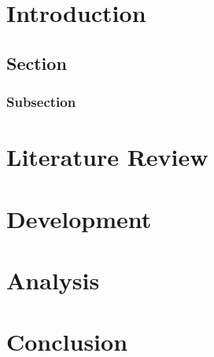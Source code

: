 
\chapter{Introduction}

\section{Section}

\subsection{Subsection}

\chapter{Literature Review}
\chapter{Development}

\chapter{Analysis}

\chapter{Conclusion}